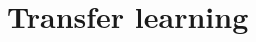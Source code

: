 \documentclass[../main.tex]{subfiles}
\begin{document}




\section{Transfer learning}
\end{document}
